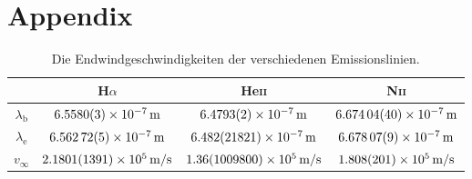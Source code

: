 \section{Appendix}
\begin{table}[t]
  \begin{tabular}{cccc}
    \toprule
    & H$\alpha$ & He\textsc{ii} & N\textsc{ii}\\
    \midrule
    $\lambda _\text{b}$ & $\SI{6.5580+-0.0003e-7}{m}$ & $\SI{6.4793+-0.0002e-7}{m}$ & $\SI{6.67404+-0.0004e-7}{m}$ \\
    $\lambda _\text{e}$ & $\SI{6.56272+-0.00005e-7}{m}$ & $\SI{6.482+-21.821e-7}{m}$ & $\SI{6.67807+-0.00009e-7}{m}$ \\
    $v_\infty$ & $\SI{2.1801+-0.1391e+5}{m/s}$ & $\SI{1.36+-10098e+5}{m/s}$ & $\SI{1.808+-0.201e+5}{m/s}$ \\
    \bottomrule
  \end{tabular}
  \caption{Die Endwindgeschwindigkeiten der verschiedenen Emissionslinien.} \label{tab:vinf}
\end{table}
\begin{figure}[h]
  \centering
  \resizebox{.5\textwidth}{!}{}
  \caption{} \label{fig:1a}
\end{figure}
\begin{figure}[h]
  \centering
  \resizebox{.5\textwidth}{!}{}
  \caption{} \label{fig:1b}
\end{figure}
\begin{figure}[h]
  \centering
  \resizebox{.5\textwidth}{!}{}
  \caption{} \label{fig:1c}
\end{figure}
\begin{figure}[h]
  \centering
  \resizebox{.5\textwidth}{!}{}
  \caption{} \label{fig:2a}
\end{figure}
\begin{figure}[h]
  \centering
  \resizebox{.5\textwidth}{!}{}
  \caption{} \label{fig:2b}
\end{figure}
\begin{figure}[h]
  \centering
  \resizebox{.5\textwidth}{!}{}
  \caption{} \label{fig:2c}
\end{figure}
\begin{figure}[h]
  \centering
  \resizebox{.5\textwidth}{!}{}
  \caption{} \label{fig:3a}
\end{figure} 
